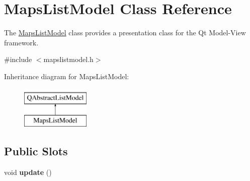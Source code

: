\hypertarget{class_maps_list_model}{}\section{Maps\+List\+Model Class Reference}
\label{class_maps_list_model}


The \hyperlink{class_maps_list_model}{Maps\+List\+Model} class provides a presentation class for the Qt Model-\/\+View framework.  




{\ttfamily \#include $<$mapslistmodel.\+h$>$}

Inheritance diagram for Maps\+List\+Model\+:\begin{figure}[H]
\begin{center}
\leavevmode
\includegraphics[height=2.000000cm]{class_maps_list_model}
\end{center}
\end{figure}
\subsection*{Public Slots}
\begin{DoxyCompactItemize}
\item 
\hypertarget{class_maps_list_model_aa08107d25efb1fd559d054751f148a3f}{}\label{class_maps_list_model_aa08107d25efb1fd559d054751f148a3f} 
void {\bfseries update} ()
\end{DoxyCompactItemize}
